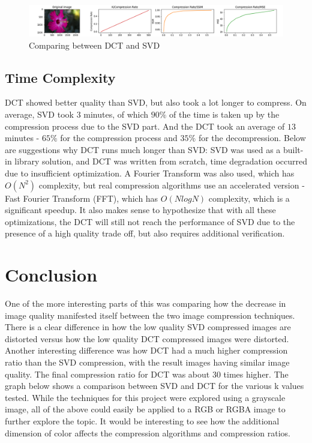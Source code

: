 \begin{figure}[H]
  \centering
  \includegraphics[width=\linewidth]{Flower Foveon.png}
  \caption{Comparing between DCT and SVD}
  \label{fig:exmp_13}
\end{figure}

\subsection{Time Complexity}

DCT showed better quality than SVD, but also took a lot longer to compress. On average, SVD took $3$ minutes, of which $90\%$ of the time is taken up by the compression process due to the SVD part. And the DCT took an average of $13$ minutes - $65\%$ for the compression process and $35\%$ for the decompression. Below are suggestions why DCT runs much longer than SVD: SVD was used as a built-in library solution, and DCT was written from scratch, time degradation occurred due to insufficient optimization. A Fourier Transform was also used, which has $O(N^2)$ complexity, but real compression algorithms use an accelerated version - Fast Fourier Transform (FFT), which has $O(N log N)$ complexity, which is a significant speedup. It also makes sense to hypothesize that with all these optimizations, the DCT will still not reach the performance of SVD due to the presence of a high quality trade off, but also requires additional verification.

\section{Conclusion}
One of the more interesting parts of this was comparing how the decrease in
image quality manifested itself between the two image compression techniques.
There is a clear difference in how the low quality SVD compressed images are
distorted versus how the low quality DCT compressed images were distorted.
Another interesting difference was how DCT had a much higher compression
ratio than the SVD compression, with the result images having similar image
quality. The final compression ratio for DCT was about 30 times higher. The
graph below shows a comparison between SVD and DCT for the various k values
tested. While the techniques for this project were explored using a grayscale image,
all of the above could easily be applied to a RGB or RGBA image to further
explore the topic. It would be interesting to see how the additional dimension
of color affects the compression algorithms and compression ratios.

